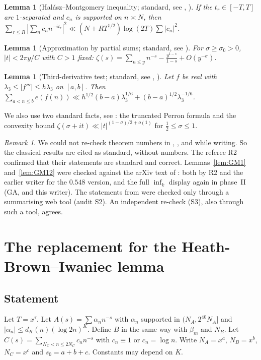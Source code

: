 \documentclass[11pt]{amsart}
\newtheorem{lemma}[theorem]{Lemma}
\theoremstyle{definition}
\theoremstyle{remark}
\newtheorem{remark}[theorem]{Remark}
\begin{document}
\begin{lemma}[Hal\'asz--Montgomery inequality; standard, see {\cite{Mo}}, {\cite{Iv}}]\label{lem:HM}
If the $t_r\in[-T,T]$ are $1$-separated and $c_n$ is supported on $n\asymp N$, then
$\sum_{r\le R}|\sum_nc_nn^{-it_r}|^2\ll(N+RT^{1/2})\log(2T)\sum|c_n|^2$.
\end{lemma}

\begin{lemma}[Approximation by partial sums; standard, see {\cite{Ti}}]\label{lem:T411}
For $\sigma\ge\sigma_0>0$, $|t|<2\pi y/C$ with $C>1$ fixed: $\zeta(s)=\sum_{n\le y}n^{-s}-\frac{y^{1-s}}{1-s}+O(y^{-\sigma})$.
\end{lemma}

\begin{lemma}[Third-derivative test; standard, see {\cite{Ti}}, {\cite{GK}}]\label{lem:T3}
Let $f$ be real with $\lambda_3\le|f'''|\le h\lambda_3$ on $[a,b]$. Then $\sum_{a<n\le b}e(f(n))\ll h^{1/2}(b-a)\lambda_3^{1/6}+(b-a)^{1/2}\lambda_3^{-1/6}$.
\end{lemma}

We also use two standard facts, see \cite{Ti}: the truncated Perron formula and the convexity bound $\zeta(\sigma+it)\ll|t|^{(1-\sigma)/2+o(1)}$
for $\frac12\le\sigma\le1$.

\begin{remark}\label{rem:sources}
We could not re-check theorem numbers in \cite{Ti}, \cite{Mo}, \cite{Iv} and \cite{GK} while writing. So the classical results are cited
as standard, without numbers. The referee R2 confirmed that their statements are standard and correct. Lemmas~\ref{lem:GM1} and~\ref{lem:GM12}
were checked against the arXiv text of \cite{GM}: both by R2 and the earlier writer for the $0.548$ version, and the full $\inf_k$ display again in
phase~II (GA, and this writer). The statements from \cite{MT} were checked only through a
summarising web tool (audit S2). An independent re-check (S3), also through such a tool, agrees.
\end{remark}

\section{The replacement for the Heath-Brown--Iwaniec lemma}\label{sec:L44}

\subsection{Statement}
Let $T=x^{\tau}$. Let $A(s)=\sum\alpha_nn^{-s}$ with $\alpha_n$ supported in $(N_A,2^{40}N_A]$ and $|\alpha_n|\le d_K(n)(\log 2n)^K$.
Define $B$ in the same way with $\beta_m$ and $N_B$. Let $C(s)=\sum_{N_C<n\le2N_C}c_nn^{-s}$ with $c_n\equiv1$ or $c_n=\log n$. Write $N_A=x^a$,
$N_B=x^b$, $N_C=x^c$ and $s_0=a+b+c$. Constants may depend on $K$.
\end{document}

